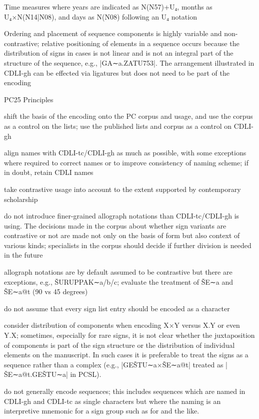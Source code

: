 \Hli{}Time measures where years are indicated as N(N57)+U₄,
  	  months as U₄×N(N14|N08), and days as N(N08) following an U₄
  	  notation

\Hendul


\Hli{}Ordering and placement of sequence components is highly
	variable and non-contrastive; relative positioning of elements
	in a sequence occurs because the distribution of signs in
	cases is not linear and is not an integral part of the
	structure of the sequence, e.g., |GA∼a.ZATU753|.  The
	arrangement illustrated in CDLI-gh can be effected via
	ligatures but does not need to be part of the encoding

\Hendul
\Hhh{}PC25 Principles

\Hul\Hli{}shift the basis of the encoding onto the PC corpus and
 	usage, and use the corpus as a control on the lists; use
 	the published lists and corpus as a control on CDLI-gh

\Hli{}align names with CDLI-tc/CDLI-gh as much as possible, with
	some exceptions where required to correct names or to improve
	consistency of naming scheme; if in doubt, retain CDLI
	names

\Hli{}take contrastive usage into account to the extent
   	supported by contemporary scholarship

\Hli{}do not introduce finer-grained allograph notations than
	CDLI-tc/CDLI-gh is using.  The decisions made in the corpus
	about whether sign variants are contrastive or not are made
	not only on the basis of form but also context of various
	kinds; specialists in the corpus should decide if further
	division is needed in the future

\Hli{}allograph notations are by default assumed to be
	contrastive but there are exceptions, e.g., ŠURUPPAK∼a/b/c;
	evaluate the treatment of ŠE∼a and ŠE∼a@t (90 vs 45 degrees)

\Hli{}do not assume that every sign list entry should be encoded
   	as a character

\Hli{}consider distribution of components when encoding X×Y
	versus X.Y or even Y.X; sometimes, especially for rare signs,
	it is not clear whether the juxtaposition of components is
	part of the sign structure or the distribution of individual
	elements on the manuscript. In such cases it is preferable to
	treat the signs as a sequence rather than a complex (e.g.,
	|GEŠTU∼a×ŠE∼a@t| treated as |ŠE∼a@t.GEŠTU∼a| in PCSL).

\Hli{}do not generally encode sequences; this includes sequences
	which are named in CDLI-gh and CDLI-tc as single characters
	but where the naming is an interpretive mnemonic for a sign
	group such as  for  and
	the like.

